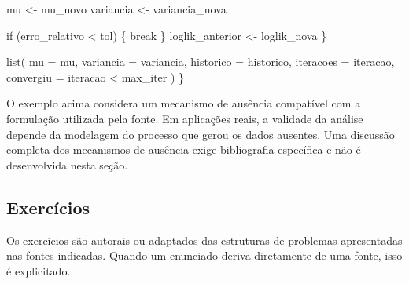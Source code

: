\documentclass[
  letterpaper,
  DIV=11,
  numbers=noendperiod]{scrreprt}
\newenvironment{Shaded}{\begin{snugshade}}{\end{snugshade}}
\newcommand{\AttributeTok}[1]{\textcolor[rgb]{0.40,0.45,0.13}{#1}}
\newcommand{\ControlFlowTok}[1]{\textcolor[rgb]{0.00,0.23,0.31}{#1}}
\newcommand{\FunctionTok}[1]{\textcolor[rgb]{0.28,0.35,0.67}{#1}}
\newcommand{\NormalTok}[1]{\textcolor[rgb]{0.00,0.23,0.31}{#1}}
\newcommand{\OtherTok}[1]{\textcolor[rgb]{0.00,0.23,0.31}{#1}}
\newcommand{\SpecialCharTok}[1]{\textcolor[rgb]{0.37,0.37,0.37}{#1}}
\begin{document}
\begin{Shaded}
\begin{Highlighting}[]
\NormalTok{    mu }\OtherTok{\textless{}{-}}\NormalTok{ mu\_novo}
\NormalTok{    variancia }\OtherTok{\textless{}{-}}\NormalTok{ variancia\_nova}

    \ControlFlowTok{if}\NormalTok{ (erro\_relativo }\SpecialCharTok{\textless{}}\NormalTok{ tol) \{}
      \ControlFlowTok{break}
\NormalTok{    \}}
\NormalTok{    loglik\_anterior }\OtherTok{\textless{}{-}}\NormalTok{ loglik\_nova}
\NormalTok{  \}}

  \FunctionTok{list}\NormalTok{(}
    \AttributeTok{mu =}\NormalTok{ mu,}
    \AttributeTok{variancia =}\NormalTok{ variancia,}
    \AttributeTok{historico =}\NormalTok{ historico,}
    \AttributeTok{iteracoes =}\NormalTok{ iteracao,}
    \AttributeTok{convergiu =}\NormalTok{ iteracao }\SpecialCharTok{\textless{}}\NormalTok{ max\_iter}
\NormalTok{  )}
\NormalTok{\}}
\end{Highlighting}
\end{Shaded}

\begin{tcolorbox}[enhanced jigsaw, colback=white, leftrule=.75mm, colbacktitle=quarto-callout-warning-color!10!white, breakable, titlerule=0mm, bottomtitle=1mm, title=\textcolor{quarto-callout-warning-color}{\faExclamationTriangle}\hspace{0.5em}{Interpretação do exemplo}, colframe=quarto-callout-warning-color-frame, toprule=.15mm, opacityback=0, bottomrule=.15mm, opacitybacktitle=0.6, arc=.35mm, toptitle=1mm, rightrule=.15mm, coltitle=black, left=2mm]

O exemplo acima considera um mecanismo de ausência compatível com a
formulação utilizada pela fonte. Em aplicações reais, a validade da
análise depende da modelagem do processo que gerou os dados ausentes.
Uma discussão completa dos mecanismos de ausência exige bibliografia
específica e não é desenvolvida nesta seção.

\end{tcolorbox}

\subsection{Exercícios}\label{exercuxedcios-5}

Os exercícios são autorais ou adaptados das estruturas de problemas
apresentadas nas fontes indicadas. Quando um enunciado deriva
diretamente de uma fonte, isso é explicitado.
\end{document}
